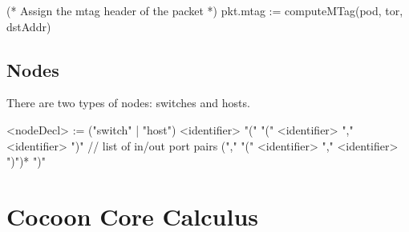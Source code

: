 \documentclass{report}
\begin{document}
\begin{ccnlisting}{}
(* Assign the mtag header of the packet *)
pkt.mtag := computeMTag(pod, tor, dstAddr)
\end{ccnlisting}

\section{Nodes}

There are two types of nodes: switches and hosts.  

\begin{bnflisting}{}
<nodeDecl> := ("switch" | "host") <identifier> "(" 
              "(" <identifier> "," <identifier> ")" // list of in/out port pairs
              ("," "(" <identifier> "," <identifier> ")")*
              ")"
\end{bnflisting}

\clearpage
\appendix

\chapter{Cocoon Core Calculus}
\end{document}
